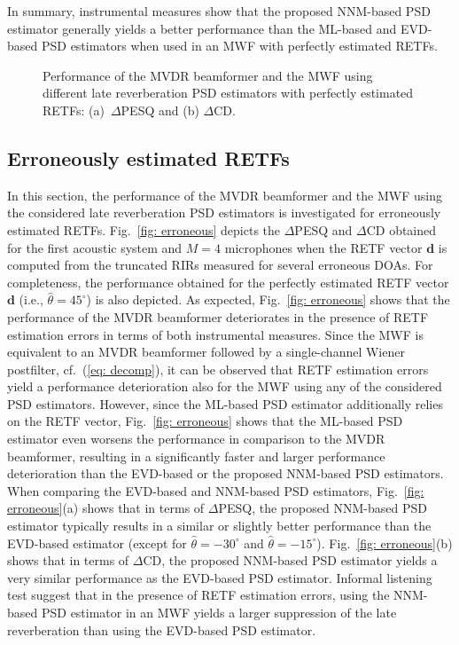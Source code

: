 \documentclass{article}
\begin{document}
In summary, instrumental measures show that the proposed NNM-based PSD estimator generally yields a better performance than the ML-based and EVD-based PSD estimators when used in an MWF with perfectly estimated RETFs.
\begin{figure}[t!]
  
\caption{Performance of the MVDR beamformer and the MWF using different late reverberation PSD estimators with perfectly estimated RETFs: (a)~$\Delta$PESQ and (b) $\Delta$CD.}
\label{fig: perfect}
\end{figure}
\subsection{Erroneously estimated RETFs}
\label{sec: exp2}
In this section, the performance of the MVDR beamformer and the MWF using the considered late reverberation PSD estimators is investigated for erroneously estimated RETFs.
Fig.~\ref{fig: erroneous} depicts the $\Delta$PESQ and $\Delta$CD obtained for the first acoustic system and $M = 4$ microphones when the RETF vector $\mathbf{d}$ is computed from the truncated RIRs measured for several erroneous DOAs.
For completeness, the performance obtained for the perfectly estimated RETF vector $\mathbf{d}$ (i.e., $\hat{\theta} = 45^{\circ}$) is also depicted.
As expected, Fig.~\ref{fig: erroneous} shows that the performance of the MVDR beamformer deteriorates in the presence of RETF estimation errors in terms of both instrumental measures.
Since the MWF is equivalent to an MVDR beamformer followed by a single-channel Wiener postfilter, cf.~(\ref{eq: decomp}), it can be observed that RETF estimation errors yield a performance deterioration also for the MWF using any of the considered PSD estimators.
However, since the ML-based PSD estimator additionally relies on the RETF vector, Fig.~\ref{fig: erroneous} shows that the ML-based PSD estimator even worsens the performance in comparison to the MVDR beamformer, resulting in a significantly faster and larger performance deterioration than the EVD-based or the proposed NNM-based PSD estimators.
When comparing the EVD-based and NNM-based PSD estimators, Fig.~\ref{fig: erroneous}(a) shows that in terms of $\Delta$PESQ, the proposed NNM-based PSD estimator typically results in a similar or slightly better performance than the EVD-based estimator (except for $\hat{\theta} = -30^{\circ}$ and $\hat{\theta} = -15^{\circ}$).
Fig.~\ref{fig: erroneous}(b) shows that in terms of $\Delta$CD, the proposed NNM-based PSD estimator yields a very similar performance as the EVD-based PSD estimator.
Informal listening test suggest that in the presence of RETF estimation errors, using the NNM-based PSD estimator in an MWF yields a larger suppression of the late reverberation than using the EVD-based PSD estimator.
\end{document}
